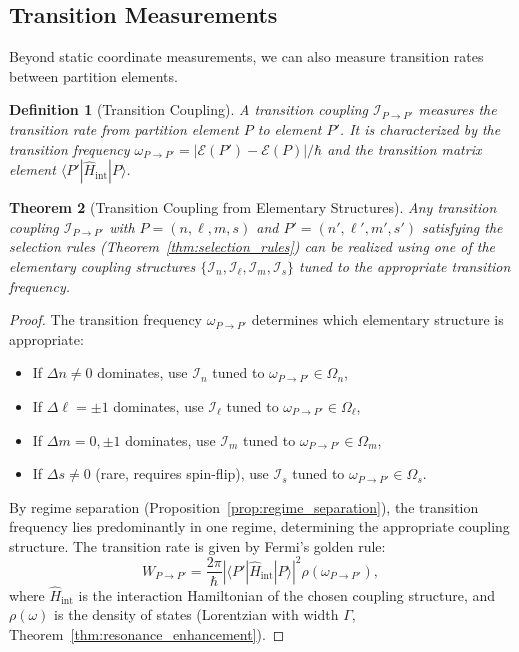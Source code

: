 \documentclass[twocolumn,10pt,a4paper]{article}
\newtheorem{theorem}{Theorem}[section]
\newtheorem{definition}[theorem]{Definition}
\theoremstyle{remark}
\begin{document}
\subsection{Transition Measurements}

Beyond static coordinate measurements, we can also measure transition rates between partition elements.

\begin{definition}[Transition Coupling]
\label{def:transition_coupling}
A \emph{transition coupling} $\mathcal{I}_{P \to P'}$ measures the transition rate from partition element $P$ to element $P'$. It is characterized by the transition frequency $\omega_{P \to P'} = |\mathcal{E}(P') - \mathcal{E}(P)|/\hbar$ and the transition matrix element $\langle P' | \hat{H}_{\text{int}} | P \rangle$.
\end{definition}

\begin{theorem}[Transition Coupling from Elementary Structures]
\label{thm:transition_construction}
Any transition coupling $\mathcal{I}_{P \to P'}$ with $P = (n, \ell, m, s)$ and $P' = (n', \ell', m', s')$ satisfying the selection rules (Theorem~\ref{thm:selection_rules}) can be realized using one of the elementary coupling structures $\{\mathcal{I}_n, \mathcal{I}_\ell, \mathcal{I}_m, \mathcal{I}_s\}$ tuned to the appropriate transition frequency.
\end{theorem}

\begin{proof}
The transition frequency $\omega_{P \to P'}$ determines which elementary structure is appropriate:
\begin{itemize}[noitemsep]
    \item If $\Delta n \neq 0$ dominates, use $\mathcal{I}_n$ tuned to $\omega_{P \to P'} \in \Omega_n$,
    \item If $\Delta \ell = \pm 1$ dominates, use $\mathcal{I}_\ell$ tuned to $\omega_{P \to P'} \in \Omega_\ell$,
    \item If $\Delta m = 0, \pm 1$ dominates, use $\mathcal{I}_m$ tuned to $\omega_{P \to P'} \in \Omega_m$,
    \item If $\Delta s \neq 0$ (rare, requires spin-flip), use $\mathcal{I}_s$ tuned to $\omega_{P \to P'} \in \Omega_s$.
\end{itemize}

By regime separation (Proposition~\ref{prop:regime_separation}), the transition frequency lies predominantly in one regime, determining the appropriate coupling structure. The transition rate is given by Fermi's golden rule:
\begin{equation}
W_{P \to P'} = \frac{2\pi}{\hbar} \left|\langle P' | \hat{H}_{\text{int}} | P \rangle\right|^2 \rho(\omega_{P \to P'}),
\end{equation}
where $\hat{H}_{\text{int}}$ is the interaction Hamiltonian of the chosen coupling structure, and $\rho(\omega)$ is the density of states (Lorentzian with width $\Gamma$, Theorem~\ref{thm:resonance_enhancement}).
\end{proof}
\end{document}
